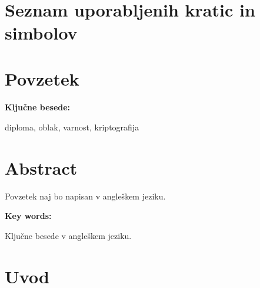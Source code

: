 \documentclass[12pt,a4paper,openany]{book}
\begin{document}
\ \thispagestyle{empty}

\newpage


\renewcommand\thepage{}
\tableofcontents
\renewcommand\thepage{\arabic{page}}

\thispagestyle{empty}



\chapter*{Seznam uporabljenih kratic in simbolov}
\thispagestyle{empty}

\printglossaries{}


\clearpage{\pagestyle{empty}\cleardoublepage}


\setcounter{page}{1}

\chapter*{Povzetek}



\vspace{1.3cm}
\noindent
{\large \bf Ključne besede:}

\vspace{0.5cm}
\noindent
diploma, oblak, varnost, kriptografija


\chapter*{Abstract}


Povzetek naj bo napisan v angleškem jeziku.

\vspace{1.3cm}
\noindent
{\large \bf Key words:}

\vspace{0.5cm}
\noindent
Ključne besede v angleškem jeziku.



\chapter{Uvod}
\end{document}
